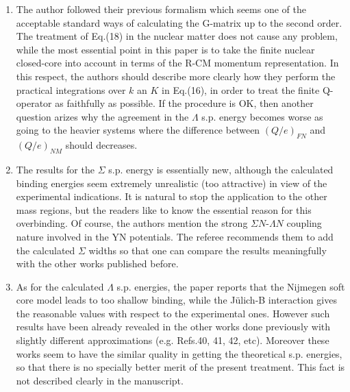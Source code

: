 \begin{enumerate}
\item 
The author followed their previous formalism which seems one of the 
acceptable standard ways of calculating the G-matrix up to the second 
order. The treatment of Eq.(18) in the nuclear matter does not cause 
any problem, while the most essential point in this paper is to take 
the finite nuclear closed-core into account in terms of the R-CM 
momentum representation. In this respect, the authors should describe 
more clearly how they perform the practical integrations over $k$ an 
$K$ in Eq.(16), in order to treat the finite Q-operator as faithfully 
as possible. If the procedure is OK, then another question arizes 
why the agreement in the $\Lambda$ s.p. energy becomes worse as going 
to the heavier systems where the difference between $(Q/e)_{FN}$ and 
$(Q/e)_{NM}$ should decreases. 

\item
The results for the $\Sigma$ s.p. energy is essentially new, although 
the calculated binding energies seem extremely unrealistic (too 
attractive) in view of the experimental indications. It is natural to 
stop the application to the other mass regions, but the readers like 
to know the essential reason for this overbinding. Of course, the 
authors mention the strong $\Sigma N$-$\Lambda N$ coupling nature 
involved in the YN potentials. The referee recommends them to add 
the calculated $\Sigma$ widths so that one can compare the results 
meaningfully with the other works published before. 

\item 
As for the calculated $\Lambda$ s.p. energies, the paper reports that 
the Nijmegen soft core model leads to too shallow binding, while the 
J\"ulich-B interaction gives the reasonable values with respect to the 
experimental ones. However such results have been already revealed 
in the other works done previously with slightly different 
approximations (e.g. Refs.40, 41, 42, etc). Moreover these works seem 
to have the similar quality in getting the theoretical s.p. energies, 
so that there is no specially better merit of the present treatment. 
This fact is not described clearly in the manuscript. 


\end{enumerate}
